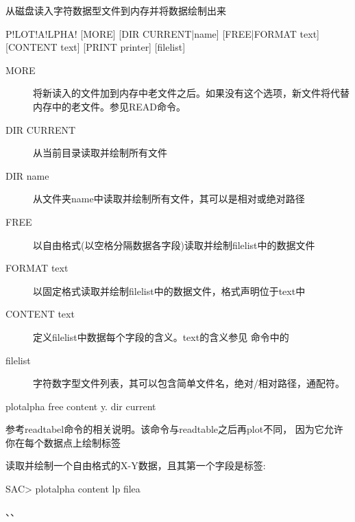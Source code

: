 \label{cmd:plotalpha}

从磁盘读入字符数据型文件到内存并将数据绘制出来

\begin{SACSTX}
P!LOT!A!LPHA! [MORE] [DIR CURRENT|name] [FREE|FORMAT text] [CONTENT text]
    [PRINT printer] [filelist]
\end{SACSTX}

\begin{description}
\item [MORE] 将新读入的文件加到内存中老文件之后。如果没有这个选项，新文件将代替内存中的老文件。参见READ命令。
\item [DIR CURRENT] 从当前目录读取并绘制所有文件
\item [DIR name] 从文件夹name中读取并绘制所有文件，其可以是相对或绝对路径
\item [FREE] 以自由格式(以空格分隔数据各字段)读取并绘制filelist中的数据文件
\item [FORMAT text] 以固定格式读取并绘制filelist中的数据文件，格式声明位于text中
\item [CONTENT text] 定义filelist中数据每个字段的含义。text的含义参见  命令中的
\item [filelist] 字符数字型文件列表，其可以包含简单文件名，绝对/相对路径，通配符。
\end{description}

\begin{SACDFT}
plotalpha free content y. dir current
\end{SACDFT}

参考readtabel命令的相关说明。该命令与readtable之后再plot不同，
因为它允许你在每个数据点上绘制标签

读取并绘制一个自由格式的X-Y数据，且其第一个字段是标签:
\begin{SACCode}
SAC> plotalpha content lp filea
\end{SACCode}

、、
